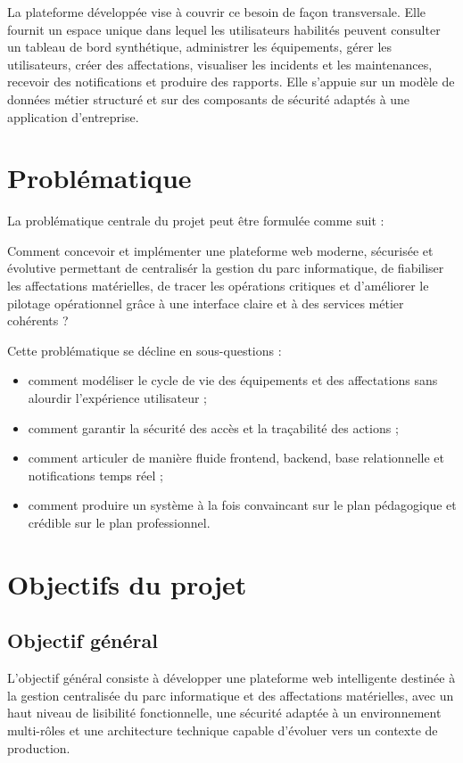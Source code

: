 ﻿\documentclass[12pt,a4paper,oneside]{report}
\begin{document}
La plateforme développée vise à couvrir ce besoin de façon transversale. Elle fournit un espace unique dans lequel les utilisateurs habilités peuvent consulter un tableau de bord synthétique, administrer les équipements, gérer les utilisateurs, créer des affectations, visualiser les incidents et les maintenances, recevoir des notifications et produire des rapports. Elle s'appuie sur un modèle de données métier structuré et sur des composants de sécurité adaptés à une application d'entreprise.

\section{Problématique}
La problématique centrale du projet peut être formulée comme suit :

\begin{keybox}[Problématique]
Comment concevoir et implémenter une plateforme web moderne, sécurisée et évolutive permettant de centralisér la gestion du parc informatique, de fiabiliser les affectations matérielles, de tracer les opérations critiques et d'améliorer le pilotage opérationnel grâce à une interface claire et à des services métier cohérents ?
\end{keybox}

Cette problématique se décline en sous-questions :
\begin{itemize}
  \item comment modéliser le cycle de vie des équipements et des affectations sans alourdir l'expérience utilisateur ;
  \item comment garantir la sécurité des accès et la traçabilité des actions ;
  \item comment articuler de manière fluide frontend, backend, base relationnelle et notifications temps réel ;
  \item comment produire un système à la fois convaincant sur le plan pédagogique et crédible sur le plan professionnel.
\end{itemize}

\section{Objectifs du projet}
\subsection{Objectif général}
L'objectif général consiste à développer une plateforme web intelligente destinée à la gestion centralisée du parc informatique et des affectations matérielles, avec un haut niveau de lisibilité fonctionnelle, une sécurité adaptée à un environnement multi-rôles et une architecture technique capable d'évoluer vers un contexte de production.
\end{document}
